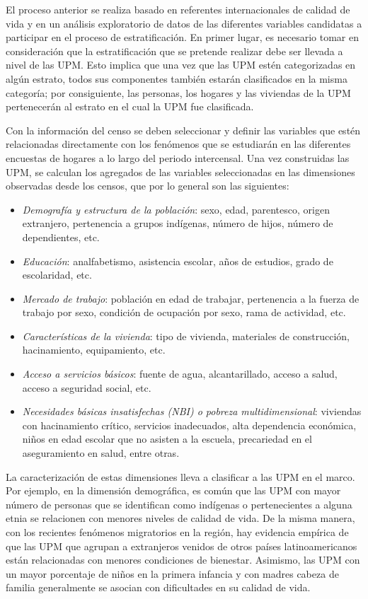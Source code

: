 \documentclass[
  12pt,
  spanish,
]{book}
\providecommand{\tightlist}{%
  \setlength{\itemsep}{0pt}\setlength{\parskip}{0pt}}
\begin{document}
El proceso anterior se realiza basado en referentes internacionales de calidad de vida y en un análisis exploratorio de datos de las diferentes variables candidatas a participar en el proceso de estratificación. En primer lugar, es necesario tomar en consideración que la estratificación que se pretende realizar debe ser llevada a nivel de las UPM. Esto implica que una vez que las UPM estén categorizadas en algún estrato, todos sus componentes también estarán clasificados en la misma categoría; por consiguiente, las personas, los hogares y las viviendas de la UPM pertenecerán al estrato en el cual la UPM fue clasificada.

Con la información del censo se deben seleccionar y definir las variables que estén relacionadas directamente con los fenómenos que se estudiarán en las diferentes encuestas de hogares a lo largo del periodo intercensal. Una vez construidas las UPM, se calculan los agregados de las variables seleccionadas en las dimensiones observadas desde los censos, que por lo general son las siguientes:

\begin{itemize}
\tightlist
\item
  \emph{Demografía y estructura de la población}: sexo, edad, parentesco, origen extranjero, pertenencia a grupos indígenas, número de hijos, número de dependientes, etc.
\item
  \emph{Educación}: analfabetismo, asistencia escolar, años de estudios, grado de escolaridad, etc.
\item
  \emph{Mercado de trabajo}: población en edad de trabajar, pertenencia a la fuerza de trabajo por sexo, condición de ocupación por sexo, rama de actividad, etc.
\item
  \emph{Características de la vivienda}: tipo de vivienda, materiales de construcción, hacinamiento, equipamiento, etc.
\item
  \emph{Acceso a servicios básicos}: fuente de agua, alcantarillado, acceso a salud, acceso a seguridad social, etc.
\item
  \emph{Necesidades básicas insatisfechas (NBI) o pobreza multidimensional}: viviendas con hacinamiento crítico, servicios inadecuados, alta dependencia económica, niños en edad escolar que no asisten a la escuela, precariedad en el aseguramiento en salud, entre otras.
\end{itemize}

La caracterización de estas dimensiones lleva a clasificar a las UPM en el marco. Por ejemplo, en la dimensión demográfica, es común que las UPM con mayor número de personas que se identifican como indígenas o pertenecientes a alguna etnia se relacionen con menores niveles de calidad de vida. De la misma manera, con los recientes fenómenos migratorios en la región, hay evidencia empírica de que las UPM que agrupan a extranjeros venidos de otros países latinoamericanos están relacionadas con menores condiciones de bienestar. Asimismo, las UPM con un mayor porcentaje de niños en la primera infancia y con madres cabeza de familia generalmente se asocian con dificultades en su calidad de vida.
\end{document}
